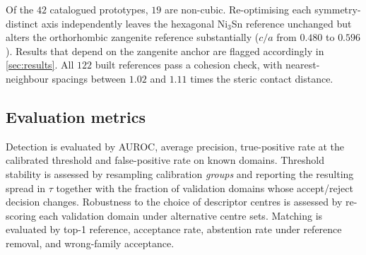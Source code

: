 Of the $42$ catalogued prototypes, $19$ are non-cubic. Re-optimising each
symmetry-distinct axis independently leaves the hexagonal Ni$_3$Sn reference unchanged but
alters the orthorhombic zangenite reference substantially ($c/a$ from $0.480$ to $0.596$).
Results that depend on the zangenite anchor are flagged accordingly in \cref{sec:results}.
All $122$ built references pass a cohesion check, with nearest-neighbour spacings between
$1.02$ and $1.11$ times the steric contact distance.

\subsection{Evaluation metrics}
\label{sec:metrics}

Detection is evaluated by AUROC, average precision, true-positive rate at the calibrated
threshold and false-positive rate on known domains. Threshold stability is assessed by
resampling calibration \emph{groups} and reporting the resulting spread in $\tau$ together
with the fraction of validation domains whose accept/reject decision changes. Robustness to
the choice of descriptor centres is assessed by re-scoring each validation domain under
alternative centre sets. Matching is evaluated by top-1 reference, acceptance rate,
abstention rate under reference removal, and wrong-family acceptance.
